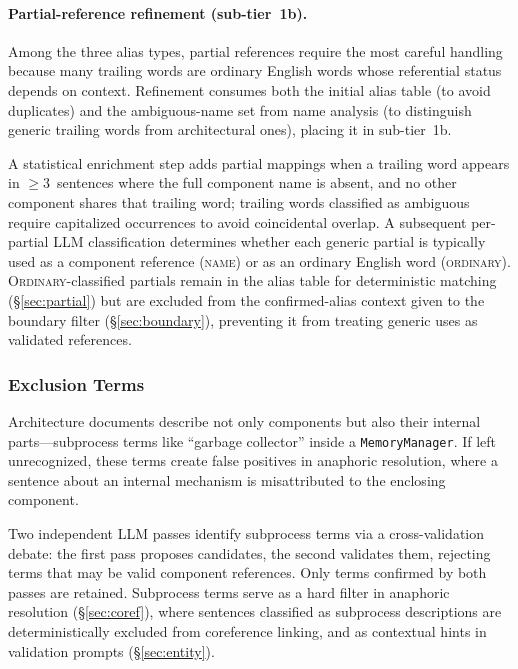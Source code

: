 \paragraph{Partial-reference refinement (sub-tier~1b).}
Among the three alias types, partial references require the most
careful handling because many trailing words are ordinary English
words whose referential status depends on context.
Refinement consumes both the initial alias table (to avoid
duplicates) and the ambiguous-name set from name analysis (to
distinguish generic trailing words from architectural ones),
placing it in sub-tier~1b.

A statistical enrichment step adds partial mappings when a trailing
word appears in $\ge3$~sentences where the full component name is
absent, and no other component shares that trailing word;
trailing words classified as ambiguous require capitalized occurrences
to avoid coincidental overlap.
A subsequent per-partial LLM classification determines whether each
generic partial is typically used as a component reference
(\textsc{name}) or as an ordinary English word (\textsc{ordinary}).
\textsc{Ordinary}-classified partials remain in the alias table
for deterministic matching (\S\ref{sec:partial}) but are
excluded from the confirmed-alias context given to the boundary
filter (\S\ref{sec:boundary}), preventing it from treating
generic uses as validated references.

\subsubsection{Exclusion Terms}\label{sec:exclusion}

Architecture documents describe not only components but also their
internal parts---subprocess terms like ``garbage collector'' inside a
\texttt{MemoryManager}.
If left unrecognized, these terms create false positives in
anaphoric resolution, where a sentence about an internal mechanism
is misattributed to the enclosing component.

Two independent LLM passes identify subprocess terms via a
cross-validation debate: the first pass proposes candidates, the
second validates them, rejecting terms that may be valid component
references.
Only terms confirmed by both passes are retained.
Subprocess terms serve as a hard filter in anaphoric resolution
(\S\ref{sec:coref}), where sentences classified as subprocess
descriptions are deterministically excluded from coreference linking,
and as contextual hints in validation prompts (\S\ref{sec:entity}).

